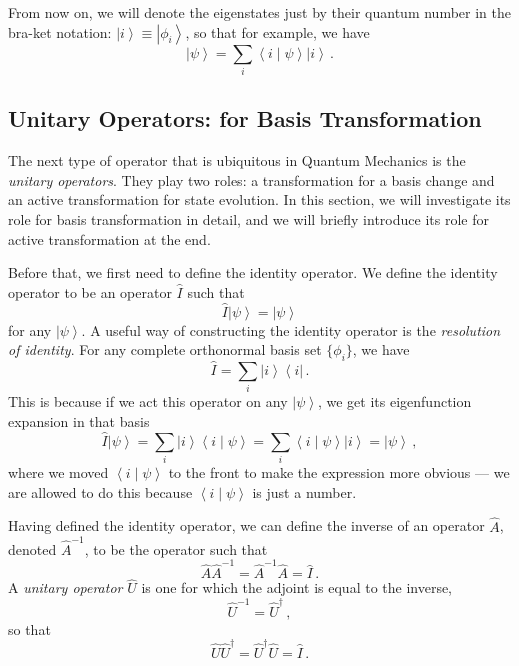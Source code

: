 \documentclass{article}
\theoremstyle{plain}\theoremheaderfont{\normalfont\itshape}\theorembodyfont{\rmfamily}\theoremseparator{.}\newtheorem*{rem}{Remark}\newtheorem*{ex}{Example}\newtheorem*{proof}{Proof}\newtheorem*{altp}{Alternative proof}
\theoremstyle{plain}\theoremheaderfont{\normalfont\bfseries}\theorembodyfont{\rmfamily}\theoremseparator{.}\newtheorem{thm}{Theorem}[section]\newtheorem{lem}[thm]{Lemma}\newtheorem{prop}[thm]{Proposition}\newtheorem*{cor}{Corollary}\newtheorem{defn}[thm]{Definition}\newtheorem{clm}[thm]{Claim}\newtheorem{clminproof}{Claim}
\theoremstyle{break}\theoremheaderfont{\normalfont\itshape}\theorembodyfont{\rmfamily}\theoremseparator{.\medskip}\newtheorem*{proofskip}{Proof}\newtheorem*{exs}{Examples}\newtheorem*{rems}{Remarks}
\theoremstyle{break}\theoremheaderfont{\normalfont\bfseries}\theorembodyfont{\rmfamily}\theoremseparator{.\medskip}\newtheorem{lemskip}[thm]{Lemma}\newtheorem{defnskip}[thm]{Definition}\newtheorem{propskip}[thm]{Proposition}\newtheorem{thmskip}[thm]{Theorem}
\numberwithin{equation}{section}
\newcommand{\bra}[1]{\left\langle #1 \right|}
\newcommand{\ket}[1]{\left| #1 \right\rangle}
\newcommand{\braket}[2]{\left\langle #1 \middle| #2 \right\rangle}
\begin{document}
    From now on, we will denote the eigenstates just by their quantum number in the bra-ket notation: \(\ket{i}\equiv\ket{\phi_i}\), so that for example, we have
    \begin{equation}
        \ket{\psi}=\sum_i\braket{i}{\psi}\ket{i}\,.
    \end{equation}

    \subsection{Unitary Operators: for Basis Transformation}
    The next type of operator that is ubiquitous in Quantum Mechanics is the \textit{unitary operators}. They play two roles: a transformation for a basis change and an active transformation for state evolution. In this section, we will investigate its role for basis transformation in detail, and we will briefly introduce its role for active transformation at the end.

    Before that, we first need to define the identity operator. We define the identity operator to be an operator \(\hat{I}\) such that
    \begin{equation}
        \hat{I}\ket{\psi}=\ket{\psi}
    \end{equation}
    for any \(\ket{\psi}\). A useful way of constructing the identity operator is the \textit{resolution of identity}. For any complete orthonormal basis set \(\{\phi_i\}\), we have
    \begin{equation}
        \hat{I}=\sum_i\ket{i}\bra{i}\,.
    \end{equation}
    This is because if we act this operator on any \(\ket{\psi}\), we get its eigenfunction expansion in that basis
    \begin{equation}
        \hat{I}\ket{\psi}=\sum_{i}\ket{i}\braket{i}{\psi}=\sum_{i}\braket{i}{\psi}\ket{i}=\ket{\psi}\,,
    \end{equation}
    where we moved \(\braket{i}{\psi}\) to the front to make the expression more obvious --- we are allowed to do this because \(\braket{i}{\psi}\) is just a number.

    Having defined the identity operator, we can define the inverse of an operator \(\hat{A}\), denoted \(\hat{A}^{-1}\), to be the operator such that
    \begin{equation}
        \hat{A}\hat{A}^{-1}=\hat{A}^{-1}\hat{A}=\hat{I}\,.
    \end{equation}
    A \textit{unitary operator} \(\hat{U}\) is one for which the adjoint is equal to the inverse,
    \begin{equation}
        \hat{U}^{-1}=\hat{U}^\dagger\,,
    \end{equation}
    so that
    \begin{equation}
        \hat{U}\hat{U}^\dagger=\hat{U}^\dagger\hat{U}=\hat{I}\,.
    \end{equation}
\end{document}
